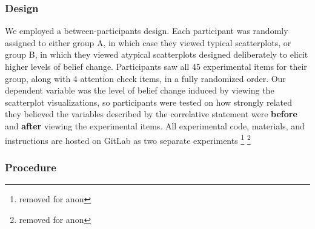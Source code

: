 \documentclass[manuscript,screen,review,anonymous]{acmart}
\begin{document}
\subsubsection{Design}\label{sec-design-main}

We employed a between-participants design. Each participant was randomly
assigned to either group A, in which case they viewed typical
scatterplots, or group B, in which they viewed atypical scatterplots
designed deliberately to elicit higher levels of belief change.
Participants saw all 45 experimental items for their group, along with 4
attention check items, in a fully randomized order. Our dependent
variable was the level of belief change induced by viewing the
scatterplot visualizations, so participants were tested on how strongly
related they believed the variables described by the correlative
statement were \textbf{before} and \textbf{after} viewing the
experimental items. All experimental code, materials, and instructions
are hosted on GitLab as two separate experiments \footnote{removed for
  anon} \footnote{removed for anon}

\subsubsection{Procedure}\label{sec-procedure-main}
\end{document}
